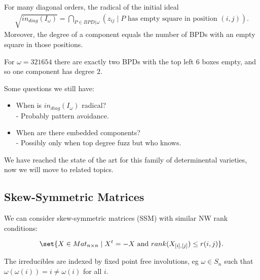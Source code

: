 \begin{theorem}
    For many diagonal orders, the radical of the initial ideal 
    \begin{align*}
        \sqrt{ in_{diag} (I_\omega) } = \bigcap_{P \in BPD(\omega} (z_{ij} \mid P \text{ has empty square in position } (i,j) ).
    \end{align*}
    Moreover, the degree of a component equals the number of BPDs with an empty square in those positions.
\end{theorem}

\begin{example}
    For $\omega = 321654$ there are exactly two BPDs with the top left $6$ boxes empty, and so one component has degree $2$.
\end{example}

\begin{remark}
    Some questions we still have:
    \begin{itemize}
        \item When is $in_{diag} (I_\omega ) $ radical?\\
        - Probably pattern avoidance.
        \item When are there embedded components?\\
        - Possibly only when top degree fuzz but who knows.
    \end{itemize}
\end{remark}

We have reached the state of the art for this family of determinental varieties, now we will move to related topics.

\subsection{Skew-Symmetric Matrices}

We can consider skew-symmetric matrices (SSM) with similar NW rank conditions:

\begin{align*}
    \set{ X \in Mat_{n \times n} \mid X^t = - X \text{ and } rank (X_{[i], [j]} ) \leq r(i,j)  }.
\end{align*}

The irreducibles are indexed by fixed point free involutions, eg $\omega \in S_n $ such that $\omega ( \omega (i) ) = i \neq \omega (i) $ for all $i$.

